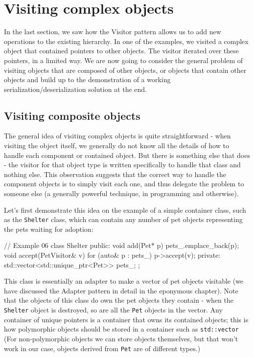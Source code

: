 \section{Visiting complex objects}

In the last section, we saw how the Visitor pattern allows us to add new operations to the existing hierarchy. In one of the examples, we visited a complex object that contained pointers to other objects. The visitor iterated over these pointers, in a limited way. We are now going to consider the general problem of visiting objects that are composed of other objects, or objects that contain other objects and build up to the demonstration of a working serialization/deserialization solution at the end.

\subsection{Visiting composite objects}

The general idea of visiting complex objects is quite straightforward - when visiting the object itself, we generally do not know all the details of how to handle each component or contained object. But there is something else that does - the visitor for that object type is written specifically to handle that class and nothing else. This observation suggests that the correct way to handle the component objects is to simply visit each one, and thus delegate the problem to someone else (a generally powerful technique, in programming and otherwise).

Let's first demonstrate this idea on the example of a simple container class, such as the \texttt{Shelter} class, which can contain any number of pet objects representing the pets waiting for adoption:

\begin{code}
// Example 06
class Shelter {
  public:
  void add(Pet* p) {
    pets_.emplace_back(p);
  }
  void accept(PetVisitor& v) {
    for (auto& p : pets_) {
      p->accept(v);
    }
  }
  private:
  std::vector<std::unique_ptr<Pet>> pets_;
};
\end{code}

This class is essentially an adapter to make a vector of pet objects visitable (we have discussed the Adapter pattern in detail in the eponymous chapter). Note that the objects of this class do own the pet objects they contain - when the \texttt{Shelter} object is destroyed, so are all the \texttt{Pet} objects in the vector. Any container of unique pointers is a container that owns its contained objects; this is how polymorphic objects should be stored in a container such as \texttt{std::vector} (For non-polymorphic objects we can store objects themselves, but that won't work in our case, objects derived from \texttt{Pet} are of different types.)

